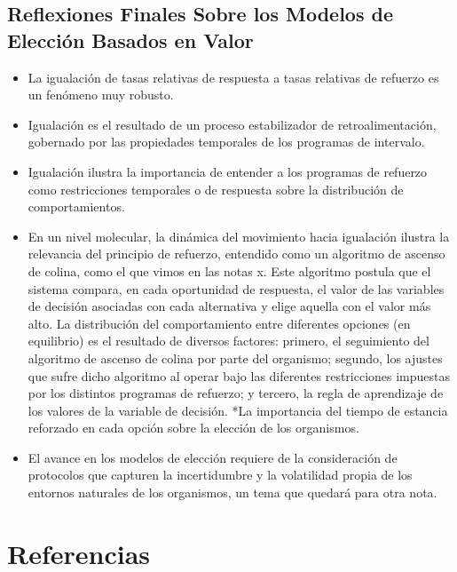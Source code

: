 \documentclass[
  letterpaper,
]{book}
\providecommand{\tightlist}{%
  \setlength{\itemsep}{0pt}\setlength{\parskip}{0pt}}\usepackage{longtable,booktabs,array}
\begin{document}
\section{Reflexiones Finales Sobre los Modelos de Elección Basados en
Valor}\label{reflexiones-finales-sobre-los-modelos-de-elecciuxf3n-basados-en-valor}

\begin{itemize}
\tightlist
\item
  La igualación de tasas relativas de respuesta a tasas relativas de
  refuerzo es un fenómeno muy robusto.
\item
  Igualación es el resultado de un proceso estabilizador de
  retroalimentación, gobernado por las propiedades temporales de los
  programas de intervalo.
\item
  Igualación ilustra la importancia de entender a los programas de
  refuerzo como restricciones temporales o de respuesta sobre la
  distribución de comportamientos.
\item
  En un nivel molecular, la dinámica del movimiento hacia igualación
  ilustra la relevancia del principio de refuerzo, entendido como un
  algoritmo de ascenso de colina, como el que vimos en las notas x. Este
  algoritmo postula que el sistema compara, en cada oportunidad de
  respuesta, el valor de las variables de decisión asociadas con cada
  alternativa y elige aquella con el valor más alto. La distribución del
  comportamiento entre diferentes opciones (en equilibrio) es el
  resultado de diversos factores: primero, el seguimiento del algoritmo
  de ascenso de colina por parte del organismo; segundo, los ajustes que
  sufre dicho algoritmo al operar bajo las diferentes restricciones
  impuestas por los distintos programas de refuerzo; y tercero, la regla
  de aprendizaje de los valores de la variable de decisión. *La
  importancia del tiempo de estancia reforzado en cada opción sobre la
  elección de los organismos.
\item
  El avance en los modelos de elección requiere de la consideración de
  protocolos que capturen la incertidumbre y la volatilidad propia de
  los entornos naturales de los organismos, un tema que quedará para
  otra nota.
\end{itemize}


\chapter*{Referencias}\label{referencias}



\backmatter
\end{document}
